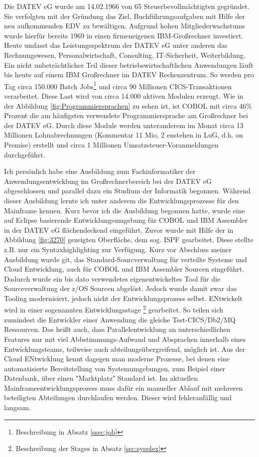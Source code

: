 {Die DATEV eG wurde am 14.02.1966 von 65 Steuerbevollmächtigten gegründet.
Sie verfolgten mit der Gründung das Ziel, Buchführungsaufgaben mit Hilfe der neu aufkommenden EDV zu bewältigen.
Aufgrund hohen Mitgliederwachstums wurde hierfür bereits 1969 in einen firmeneigenen IBM-Großrechner investiert.\cite{DATEVeG.2017}
Heute umfasst das Leistungsspektrum der DATEV eG unter anderen das Rechnungswesen, Personalwirtschaft, Consulting, IT-Sicherheit, Weiterbildung.
Ein nicht unbeträchtlicher Teil dieser betriebswirtschaftlichen Anwendungen läuft bis heute auf einem IBM Großrechner im DATEV Rechenzentrum.
So werden pro Tag circa 150.000 Batch Jobs\footnote{Beschreibung in Absatz \ref{ssec:job}} und circa 90 Millionen CICS-Transaktionen verarbeitet.
Diese Last wird von circa 14.000 aktiven Modulen erzeugt.
Wie in der Abbildung \ref{fig:Programmiersprachen} zu sehen ist, ist COBOL mit circa 46\% Prozent die am häufigsten verwendete Programmiersprache am Großrechner bei der DATEV eG.
Durch diese Module werden unteranderem im Monat circa 13 Millionen Lohnabrechnungen (Kommentar 11 Mio, 2 enstehen in LuG, d.h. on Premise) erstellt und circa 1 Millionen Umsatzsteuer-Voranmeldungen durchgeführt.

Ich persönlich habe eine Ausbildung zum Fachinformatiker der Anwendungsentwicklung im Großrechnerbereich bei der DATEV eG abgeschlossen und parallel dazu ein Studium der Informatik begonnen.
Während dieser Ausbildung lernte ich unter anderem die Entwicklungsprozesse für den Mainframe kennen.
Kurz bevor ich die Ausbildung begonnen hatte, wurde eine auf Eclipse basierende Entwicklungsumgebung für COBOL und IBM Assembler in der DATEV eG flächendeckend eingeführt.
Zuvor wurde mit Hilfe der in Abbildung \ref{fig:3270} gezeigten Oberfläche, dem sog. ISPF gearbeitet.
Diese stellte z.B. nur ein Syntaxhighlighting zur Verfügung.
Kurz vor Abschluss meiner Ausbildung wurde git, das Standard-Sourcverwaltung für verteilte Systeme und Cloud Entwicklung, auch für COBOL und IBM Assembler Sourcen eingeführt.
Dadurch wurde ein bis dato verwendetes eigenentwickeltes Tool für die Sourceverwaltung der z/OS Sourcen abgelöst.
Jedoch wurde damit zwar das Tooling modernisiert, jedoch nicht der Entwicklungsprozess selbst.
ENtwickelt wird in einer sogenannten \glqq Entwicklungsstage \grqq{} \footnote{Beschreibung der Stages in Absatz \ref{sec:sysplex}} gearbeitet. 
So teilen sich zumindest die Entwickler einer Anwendung die gleiche Test-CICS/Db2/MQ Ressourcen.
Das heißt auch, dass Parallelentwicklung an unterschiedlichen Features nur mit viel Abbstimmungs-Aufwand und Absprachen innerhalb eines Entwicklungsteams, teilweise auch abteilungsübergreifend, möglich ist.
Aus der Cloud ENtwicklung kennt dagegen man moderne Prozesse, bei denen eine automatisierte Bereitstellung von Systemumgebungen, zum Beipiel einer Datenbank, über einen "Marktplatz" Standard ist. 
Im aktuellen Mainframeentwicklungsprozess muss dafür ein manueller Ablauf mit mehreren beteiligten Abteilungen durchlaufen werden.
Dieser wird  fehleranfällig und langsam.

}
